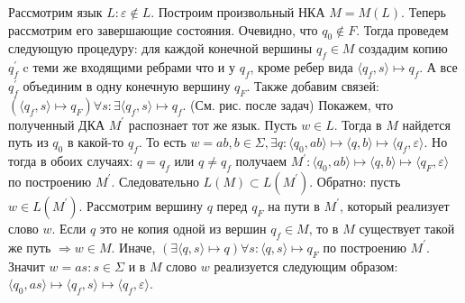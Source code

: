 \documentclass[12pt]{article}
\begin{document}
      Рассмотрим язык $L: \varepsilon \notin L$. Построим  произвольный НКА $M = M(L)$. Теперь рассмотрим его завершающие состояния. Очевидно, что $q_0 \notin F$. Тогда проведем следующую процедуру: для каждой конечной вершины $q_f \in M$ создадим копию $q^{'}_f$ c теми же входящими ребрами что и у $q_f$, кроме ребер вида $\langle q_f, s \rangle \mapsto q_f$. А все $q^{'}_f$ объединим в одну конечную вершину $q_F$. Также добавим связей: $(\langle q_f, s \rangle \mapsto q_F) \forall s: \exists \langle q_f, s \rangle \mapsto q_f$. (См. рис. после задач) Покажем, что полученный ДКА $M^{'}$ распознает тот же язык. Пусть $w \in L$. Тогда в $M$ найдется путь из $q_0$ в какой-то $q_f$. То есть $w = ab, b \in \Sigma, \exists q: \langle q_0, ab \rangle \mapsto \langle q, b \rangle \mapsto \langle q_f, \varepsilon \rangle$. Но тогда в обоих случаях: $q = q_f$ или $q \neq q_f$ получаем $M^{'}: \langle q_0, ab \rangle \mapsto \langle q, b \rangle \mapsto \langle q_F, \varepsilon \rangle$ по построению $M^{'}$. Следовательно $L(M) \subset L(M^{'})$. Обратно: пусть $w \in L(M^{'})$. Рассмотрим вершину $q$ перед $q_F$ на пути в $M^{'}$, который реализует слово $w$. Если $q$ это не копия одной из вершин $q_f \in M$, то в $M$ существует такой же путь  $\Rightarrow w \in M$. Иначе, $(\exists \langle q, s \rangle \mapsto q) \forall s: \langle q, s \rangle \mapsto q_F$ по построению $M^{'}$.  Значит $w = as: s \in \Sigma$ и в $M$ слово $w$ реализуется следующим образом: $\langle q_0, as \rangle \mapsto \langle q_f, s \rangle \mapsto \langle q_f, \varepsilon \rangle$. 
\end{document}
